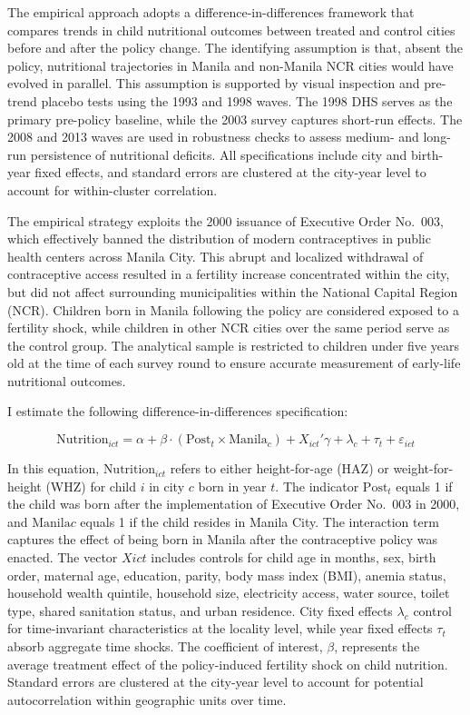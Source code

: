 \documentclass[]{AEA}
\begin{document}
The empirical approach adopts a difference-in-differences framework that
compares trends in child nutritional outcomes between treated and
control cities before and after the policy change. The identifying
assumption is that, absent the policy, nutritional trajectories in
Manila and non-Manila NCR cities would have evolved in parallel. This
assumption is supported by visual inspection and pre-trend placebo tests
using the 1993 and 1998 waves. The 1998 DHS serves as the primary
pre-policy baseline, while the 2003 survey captures short-run effects.
The 2008 and 2013 waves are used in robustness checks to assess medium-
and long-run persistence of nutritional deficits. All specifications
include city and birth-year fixed effects, and standard errors are
clustered at the city-year level to account for within-cluster
correlation.

The empirical strategy exploits the 2000 issuance of Executive Order
No.~003, which effectively banned the distribution of modern
contraceptives in public health centers across Manila City. This abrupt
and localized withdrawal of contraceptive access resulted in a fertility
increase concentrated within the city, but did not affect surrounding
municipalities within the National Capital Region (NCR). Children born
in Manila following the policy are considered exposed to a fertility
shock, while children in other NCR cities over the same period serve as
the control group. The analytical sample is restricted to children under
five years old at the time of each survey round to ensure accurate
measurement of early-life nutritional outcomes.

I estimate the following difference-in-differences specification:

\[ \text{Nutrition}_{ict} = \alpha + \beta \cdot (\text{Post}_t \times \text{Manila}_c) + X_{ict}'\gamma + \lambda_c + \tau_t + \varepsilon_{ict} \]

In this equation, \(\text{Nutrition}_{ict}\) refers to either
height-for-age (HAZ) or weight-for-height (WHZ) for child \(i\) in city
\(c\) born in year \(t\). The indicator \(\text{Post}_t\) equals 1 if
the child was born after the implementation of Executive Order No.~003
in 2000, and \(\text{Manila}c\) equals 1 if the child resides in Manila
City. The interaction term captures the effect of being born in Manila
after the contraceptive policy was enacted. The vector \(X{ict}\)
includes controls for child age in months, sex, birth order, maternal
age, education, parity, body mass index (BMI), anemia status, household
wealth quintile, household size, electricity access, water source,
toilet type, shared sanitation status, and urban residence. City fixed
effects \(\lambda_c\) control for time-invariant characteristics at the
locality level, while year fixed effects \(\tau_t\) absorb aggregate
time shocks. The coefficient of interest, \(\beta\), represents the
average treatment effect of the policy-induced fertility shock on child
nutrition. Standard errors are clustered at the city-year level to
account for potential autocorrelation within geographic units over time.
\end{document}
